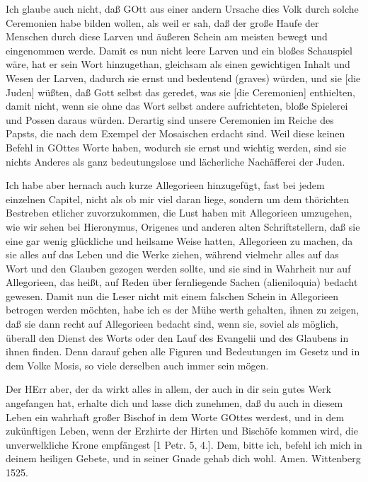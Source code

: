 Ich glaube auch nicht, daß GOtt aus einer
andern Ursache dies Volk durch solche Ceremonien habe bilden wollen, als weil er sah, daß der große Haufe der Menschen durch diese Larven und äußeren Schein am meisten bewegt und eingenommen werde. Damit es nun nicht leere Larven und ein bloßes Schauspiel wäre, hat er sein Wort hinzugethan, gleichsam als einen gewichtigen Inhalt und Wesen der Larven, dadurch sie ernst und bedeutend (graves) würden, und sie [die Juden] wüßten, daß Gott selbst das geredet, was sie [die Ceremonien] enthielten, damit nicht, wenn sie ohne das Wort selbst andere aufrichteten, bloße Spielerei und Possen daraus würden. Derartig sind unsere Ceremonien im Reiche des Papsts, die nach dem Exempel der Mosaischen erdacht sind. Weil diese keinen Befehl in GOttes Worte haben, wodurch sie ernst und wichtig werden, sind sie nichts Anderes als ganz bedeutungslose und lächerliche Nachäfferei der Juden.

Ich habe aber hernach auch kurze Allegorieen hinzugefügt, fast bei jedem einzelnen Capitel, nicht als ob mir viel daran liege, sondern um dem thörichten Bestreben etlicher zuvorzukommen, die Lust haben mit Allegorieen umzugehen, wie wir sehen bei Hieronymus, Origenes und anderen alten Schriftstellern, daß sie eine gar wenig glückliche und heilsame Weise hatten, Allegorieen zu machen, da sie alles auf das Leben und die Werke ziehen, während vielmehr alles auf das Wort und den Glauben gezogen werden sollte, und sie sind in Wahrheit nur auf Allegorieen, das heißt, auf Reden über fernliegende Sachen (alieniloquia) bedacht gewesen. Damit nun die Leser nicht mit einem falschen Schein in Allegorieen betrogen werden möchten, habe ich es der Mühe werth gehalten, ihnen zu zeigen, daß sie dann recht auf Allegorieen bedacht sind, wenn sie, soviel als möglich, überall den Dienst des Worts oder den Lauf des Evangelii und des Glaubens in ihnen finden. Denn darauf gehen alle Figuren und Bedeutungen im Gesetz und in dem Volke Mosis, so viele derselben auch immer sein mögen.

Der HErr aber, der da wirkt alles in allem, der auch in dir sein gutes Werk angefangen hat, erhalte dich und lasse dich zunehmen, daß du auch in diesem Leben ein wahrhaft großer Bischof in dem Worte GOttes werdest, und in dem zukünftigen Leben, wenn der Erzhirte der Hirten und Bischöfe kommen wird, die unverwelkliche Krone empfängest [1 Petr. 5, 4.]. Dem, bitte ich, befehl ich mich in deinem heiligen Gebete, und in seiner Gnade gehab dich wohl. Amen. Wittenberg 1525.

